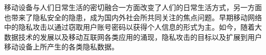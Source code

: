 


\iffalse

移动设备与人们日常生活的密切融合一方面改变了人们的日常生活方式，另一方面也带来了隐私安全的隐患，成为国内外社会所共同关注的焦点问题。早期移动网络中的隐私攻击以通过窃取用户账号密码以获得个人信息的形式为主。如今，随着大数据技术的发展以及移动互联网各类应用的涌现，隐私攻击的目标以及扩展到用户移动设备上所产生的各类隐私数据。

